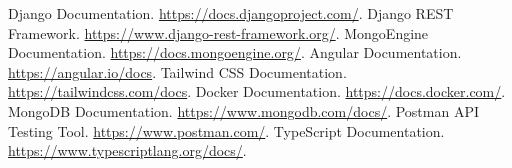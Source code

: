 \begin{thebibliography}{9}
     Django Documentation. \url{https://docs.djangoproject.com/}.
     Django REST Framework. \url{https://www.django-rest-framework.org/}.
     MongoEngine Documentation. \url{https://docs.mongoengine.org/}.
     Angular Documentation. \url{https://angular.io/docs}.
     Tailwind CSS Documentation. \url{https://tailwindcss.com/docs}.
     Docker Documentation. \url{https://docs.docker.com/}.
     MongoDB Documentation. \url{https://www.mongodb.com/docs/}.
     Postman API Testing Tool. \url{https://www.postman.com/}.
     TypeScript Documentation. \url{https://www.typescriptlang.org/docs/}.
\end{thebibliography}
